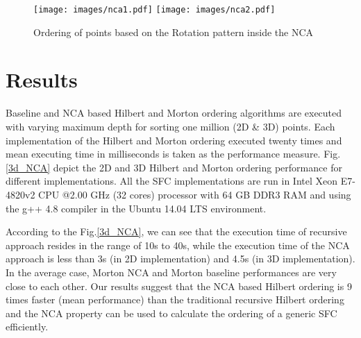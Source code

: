 \documentclass{sig-alternate}
\begin{document}
\begin{figure}[t]
\centering
\texttt{[image: images/nca1.pdf]}
\texttt{[image: images/nca2.pdf]}
\caption{Ordering of points based on the Rotation pattern inside the NCA \label{hilbertcell}}
\end{figure}

\section{Results}
Baseline and NCA based Hilbert and Morton ordering algorithms are executed with varying maximum depth for sorting one million (2D \& 3D) points. 
Each implementation of the Hilbert and Morton ordering executed twenty times and mean executing time in milliseconds is taken as the performance measure.
Fig.\ref{3d_NCA} depict the 2D and 3D Hilbert and Morton ordering performance for different implementations. All the SFC implementations are run in Intel Xeon E7-4820v2 CPU @2.00 GHz (32 cores) processor
with 64 GB DDR3 RAM and using the g++ 4.8 compiler in the Ubuntu 14.04 LTS environment. 

According to the Fig.\ref{3d_NCA}, we can see that the execution time of recursive approach resides in the range of 10s to 40s, while the execution time of the NCA approach
is less than 3s (in 2D implementation) and 4.5s (in 3D implementation). 
In the average case, Morton NCA and Morton baseline performances are very close to each other. Our results suggest that the NCA based Hilbert ordering is 9 times faster (mean performance) than the traditional recursive Hilbert
ordering and the NCA property can be used to calculate the ordering of a generic SFC efficiently. 
\end{document}
